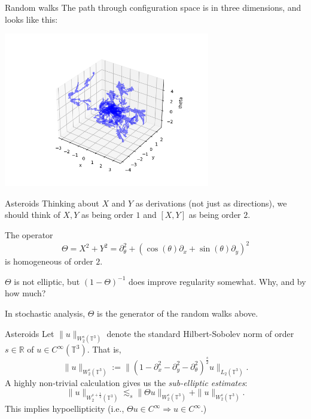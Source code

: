\documentclass{beamer}
\numberwithin{equation}{section}
\theoremstyle{plain}
\theoremstyle{plain}
\theoremstyle{definition}
\theoremstyle{plain}
\theoremstyle{plain}
\theoremstyle{definition}
\newcommand{\Rl}{\mathbb{R}}
\newcommand{\Circ}{\mathbb{T}}
\begin{document}
\begin{frame}{Random walks}
  The path through configuration space is in three dimensions, and looks like this:
  \begin{center}
  \includegraphics[width=90mm]{xyt_coords_multiple_paths.png}
  \end{center}
\end{frame}

\begin{frame}{Asteroids}
  Thinking about $X$ and $Y$ as derivations (not just as directions), we should think of $X,Y$ as being order $1$ and $[X,Y]$ as being order $2.$

  The operator
  \[
    \Theta = X^2+Y^2 = \partial_\theta^2+(\cos(\theta)\partial_x+\sin(\theta)\partial_y)^2
  \]
  is homogeneous of order $2.$
  \pause
  \begin{center}
      $\Theta$ is not elliptic, but $(1-\Theta)^{-1}$ does improve regularity somewhat. Why, and by how much?
  \end{center}
  \pause
  In stochastic analysis, $\Theta$ is the generator of the random walks above.
\end{frame}

\begin{frame}{Asteroids}
 Let $\|u\|_{W^s_2(\Circ^3)}$ denote the standard Hilbert-Sobolev norm of order $s\in \Rl$ of $u\in C^\infty(\Circ^3).$ That is,
 \[
      \|u\|_{W^s_2(\Circ^3)} := \|(1-\partial_x^2-\partial_y^2-\partial_\theta^2)^{\frac{s}{2}}u\|_{L_2(\Circ^3)}.
 \]
 A highly non-trivial calculation gives us the \emph{sub-elliptic estimates}:
  \[
      \|u\|_{W^{s+\frac12}_2(\Circ^3)}\lesssim_s \|\Theta u\|_{W^s_2(\Circ^3)}+\|u\|_{W^s_2(\Circ^3)}.
  \]
  This implies hypoellipticity (i.e., $\Theta u\in C^\infty \Rightarrow u \in C^\infty$.)
\end{frame}
\end{document}
